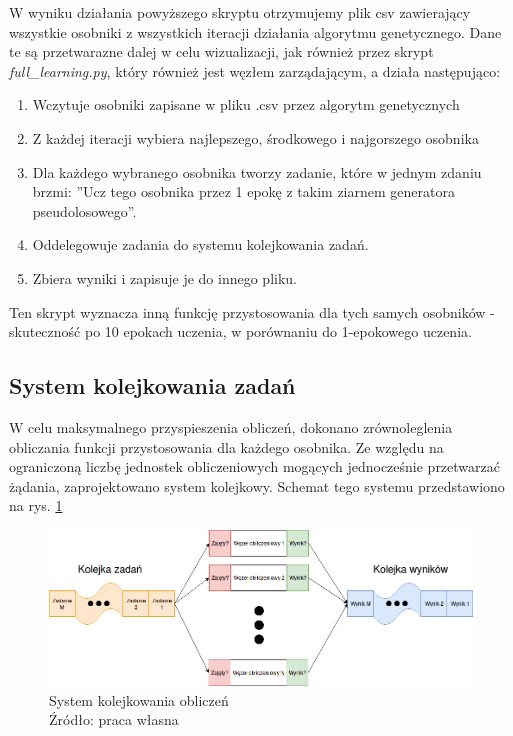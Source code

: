 W wyniku działania powyższego skryptu otrzymujemy plik csv zawierający wszystkie osobniki z wszystkich iteracji działania algorytmu genetycznego.
Dane te są przetwarazne dalej w celu wizualizacji, jak również przez skrypt \textit{full\_learning.py}, który również jest węzłem zarządającym, a działa następująco:
\begin{enumerate}
  \item Wczytuje osobniki zapisane w pliku .csv przez algorytm genetycznych
  \item Z każdej iteracji wybiera najlepszego, środkowego i najgorszego osobnika
  \item Dla każdego wybranego osobnika tworzy zadanie, które w jednym zdaniu brzmi: ''Ucz tego osobnika przez 1 epokę z takim ziarnem generatora pseudolosowego''.
  \item Oddelegowuje zadania do systemu kolejkowania zadań.
  \item Zbiera wyniki i zapisuje je do innego pliku.
\end{enumerate}
Ten skrypt wyznacza inną funkcję przystosowania dla tych samych osobników - skuteczność po 10 epokach uczenia, w porównaniu do 1-epokowego uczenia.

\subsection{System kolejkowania zadań}\label{sec:queue_system}
W celu maksymalnego przyspieszenia obliczeń, dokonano zrównoleglenia obliczania funkcji przystosowania dla każdego osobnika.
Ze względu na ograniczoną liczbę jednostek obliczeniowych mogących jednocześnie przetwarzać żądania, zaprojektowano system kolejkowy.
Schemat tego systemu przedstawiono na rys. \ref{fig:queue_system}
\begin{figure}[h!tb]
	 \centering
	 \includegraphics[width = 1.1\linewidth]{img/kolejkowanie}
	 \caption{System kolejkowania obliczeń \\
              Źródło: praca własna}
	 \label{fig:queue_system}
\end{figure}

